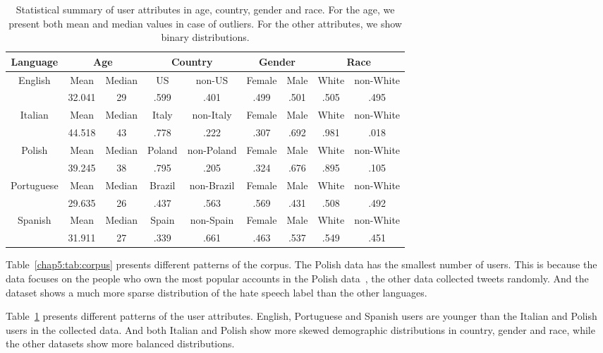 \begin{table}[tb!]
\centering
\begin{tabular}{c||cc|cc|cc|cc}
Language & \multicolumn{2}{c|}{Age} & \multicolumn{2}{c|}{Country} & \multicolumn{2}{c|}{Gender} & \multicolumn{2}{c}{Race} \\\hline\hline
\multirow{2}{*}{English} & Mean & Median & US & non-US & Female & Male & White & non-White \\
 & 32.041 & 29 & .599 & .401 & .499 & .501 & .505 & .495 \\\hline
\multirow{2}{*}{Italian} & Mean & Median & Italy & non-Italy & Female & Male & White & non-White \\
 & 44.518 & 43 & .778 & .222 & .307 & .692 & .981 & .018 \\\hline
\multirow{2}{*}{Polish} & Mean & Median & Poland & non-Poland & Female & Male & White & non-White \\
 & 39.245 & 38 & .795 & .205 & .324 & .676 & .895 & .105 \\\hline
\multirow{2}{*}{Portuguese} & Mean & Median & Brazil & non-Brazil & Female & Male & White & non-White \\
 & 29.635 & 26 & .437 & .563 & .569 & .431 & .508 & .492 \\\hline
\multirow{2}{*}{Spanish} & Mean & Median & Spain & non-Spain & Female & Male & White & non-White \\
 & 31.911 & 27 & .339 & .661 & .463 & .537 & .549 & .451
\end{tabular}
\caption{Statistical summary of user attributes in age, country, gender and race. For the age, we present both mean and median values in case of outliers. For the other attributes, we show binary distributions.}
\label{chap5:tab:user}
\end{table}

Table~\ref{chap5:tab:corpus} presents different patterns of the corpus. 
The Polish data has the smallest number of users. 
This is because the data focuses on the people who own the most popular accounts in the Polish data~\cite{ptaszynski2017learning}, the other data collected tweets randomly.
And the dataset shows a much more sparse distribution of the hate speech label than the other languages.

Table~\ref{chap5:tab:user} presents different patterns of the user attributes. 
English, Portuguese and Spanish users are younger than the Italian and Polish users in the collected data.
And both Italian and Polish show more skewed demographic distributions in country, gender and race, while the other datasets show more balanced distributions.


